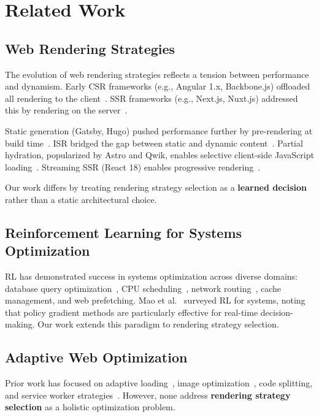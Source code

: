 \documentclass[10pt,twocolumn]{article}
\begin{document}
\section{Related Work}
\label{sec:related}

\subsection{Web Rendering Strategies}

The evolution of web rendering strategies reflects a tension between performance and dynamism. Early CSR frameworks (e.g., Angular 1.x, Backbone.js) offloaded all rendering to the client~\cite{hanafi2024comparison}. SSR frameworks (e.g., Next.js, Nuxt.js) addressed this by rendering on the server~\cite{vercel2024nextjs}.

Static generation (Gatsby, Hugo) pushed performance further by pre-rendering at build time~\cite{ollila2022modern}. ISR bridged the gap between static and dynamic content~\cite{lazuardy2022modern}. Partial hydration, popularized by Astro and Qwik, enables selective client-side JavaScript loading~\cite{miller2019islands}. Streaming SSR (React 18) enables progressive rendering~\cite{react2022react18}.

Our work differs by treating rendering strategy selection as a \textbf{learned decision} rather than a static architectural choice.

\subsection{Reinforcement Learning for Systems Optimization}

RL has demonstrated success in systems optimization across diverse domains: database query optimization~\cite{kraska2018case}, CPU scheduling~\cite{gaddam2022react18}, network routing~\cite{mao2021reinforcement}, cache management, and web prefetching. Mao et al.~\cite{mao2021reinforcement} surveyed RL for systems, noting that policy gradient methods are particularly effective for real-time decision-making. Our work extends this paradigm to rendering strategy selection.

\subsection{Adaptive Web Optimization}

Prior work has focused on adaptive loading~\cite{osmani2019adaptive}, image optimization~\cite{chen2025mrah}, code splitting, and service worker strategies~\cite{mozilla2024serviceworker}. However, none address \textbf{rendering strategy selection} as a holistic optimization problem.
\end{document}
